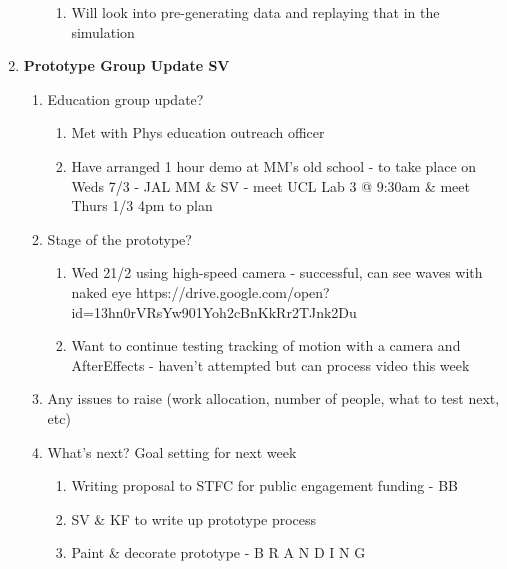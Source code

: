 \begin{enumerate}
\begin{enumerate}
\begin{enumerate}
\item  Will look into pre-generating data and replaying that in the simulation
\end{enumerate}
\vspace{5mm}

\end{enumerate}

\item  \textbf{Prototype Group Update SV}

\begin{enumerate}
\item Education group update?

\begin{enumerate}
\item  Met with Phys education outreach officer

\item  Have arranged 1 hour demo at MM's old school - to take place on Weds 7/3 - JAL MM \& SV - meet UCL Lab 3 @ 9:30am \& meet Thurs 1/3 4pm to plan
\end{enumerate}

\item  Stage of the prototype?

\begin{enumerate}
\item  Wed 21/2 using high-speed camera - successful, can see waves with naked eye https://drive.google.com/open?id=13hn0rVRsYw901Yoh2cBnKkRr2TJnk2Du

\item  Want to continue testing tracking of motion with a camera and AfterEffects - haven't attempted but can process video this week
\end{enumerate}

\item  Any issues to raise (work allocation, number of people, what to test next, etc)

\item  What's next? Goal setting for next week

\begin{enumerate}
\item  Writing proposal to STFC for public engagement funding - BB

\item  SV \& KF to write up prototype process

\item  Paint \& decorate prototype - B R A N D I N G
\end{enumerate}
\vspace{5mm}


\end{enumerate}
\end{enumerate}
